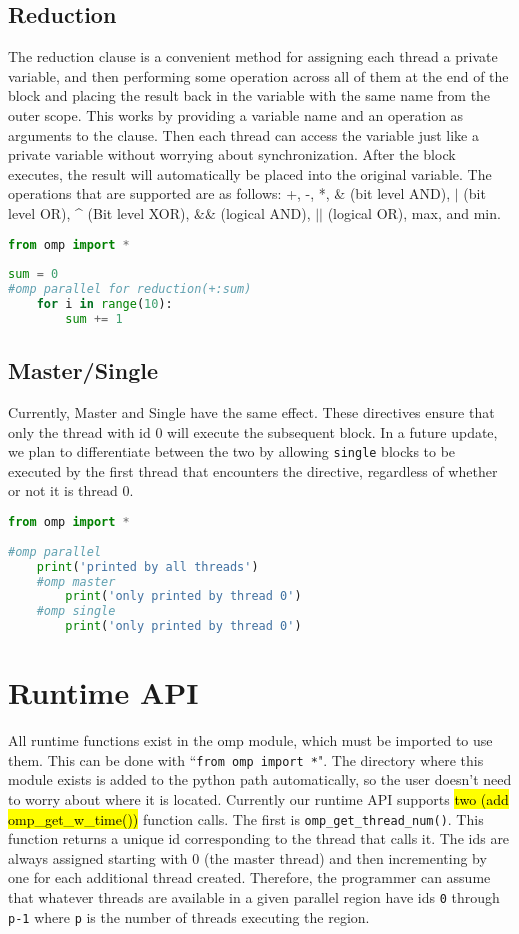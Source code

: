 \documentclass[letterpaper,12pt]{article} %
\begin{document}
\subsection{Reduction} 
The reduction clause is a convenient method for assigning each thread a private variable, and then performing some operation across all of them at the end of the block and placing the result back in the variable with the same name from the outer scope. This works by providing a variable name and an operation as arguments to the clause. Then each thread can access the variable just like a private variable without worrying about synchronization. After the block executes, the result will automatically be placed into the original variable. The operations that are supported are as follows: +, -, *, \& (bit level AND), $|$ (bit level OR), \^{} (Bit level XOR), \&\& (logical AND), $||$ (logical OR), max, and min.

\begin{lstlisting}[language=Python]
 from omp import *
 
sum = 0
#omp parallel for reduction(+:sum)
	for i in range(10):
		sum += 1
\end{lstlisting}



 \subsection{Master/Single}
 Currently, Master and Single have the same effect. These directives ensure that only the thread with id 0 will execute the subsequent block. In a future update, we plan to differentiate between the two by allowing \texttt{single} blocks to be executed by the first thread that encounters the directive, regardless of whether or not it is thread 0.
 
 \begin{lstlisting}[language=Python]
 from omp import *
 
#omp parallel
	print('printed by all threads')
	#omp master
		print('only printed by thread 0')
	#omp single
		print('only printed by thread 0')
\end{lstlisting}
 
 \section{Runtime API}
All runtime functions exist in the omp module, which must be imported to use them. This can be done with ``\texttt{from omp import *}". The directory where this module exists is added to the python path automatically, so the user doesn't need to worry about where it is located. Currently our runtime API supports \hl{two (add omp\_get\_w\_time())} function calls. The first is \texttt{omp\_get\_thread\_num()}. This function returns a unique id corresponding to the thread that calls it. The ids are always assigned starting with 0 (the master thread) and then incrementing by one for each additional thread created. Therefore, the programmer can assume that whatever threads are available in a given parallel region have ids \texttt{0} through \texttt{p-1} where \texttt{p} is the number of threads executing the region.
\end{document}
